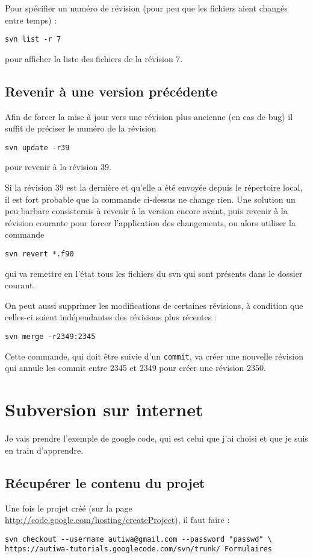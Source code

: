 \documentclass[a4paper,twoside]{article}
\begin{document}
Pour spécifier un numéro de révision (pour peu que les fichiers aient changés entre temps) : 
\begin{verbatim}
svn list -r 7
\end{verbatim}
pour afficher la liste des fichiers de la révision 7.

\subsection{Revenir à une version précédente}
Afin de forcer la mise à jour vers une révision plus ancienne (en cas de bug) il suffit de préciser le numéro de la révision
\begin{verbatim}
svn update -r39
\end{verbatim}
pour revenir à la révision $39$.

\begin{remarque}
Si la révision $39$ est la dernière et qu'elle a été envoyée depuis le répertoire local, il est fort probable que la commande ci-dessus ne change rien. Une solution un peu barbare consisterais à revenir à la version encore avant, puis revenir à la révision courante pour forcer l'application des changements, ou alors utiliser la commande 
\begin{verbatim}
svn revert *.f90
\end{verbatim}
qui va remettre en l'état tous les fichiers du svn qui sont présents dans le dossier courant.

\end{remarque}


\bigskip

On peut aussi supprimer les modifications de certaines révisions, à condition que celles-ci soient indépendantes des révisions plus récentes : 
\begin{verbatim}
svn merge -r2349:2345
\end{verbatim}

Cette commande, qui doit être suivie d'un \texttt{commit}, va créer une nouvelle révision qui annule les commit entre 2345 et 2349 pour créer une révision 2350. 


\section{Subversion sur internet}
Je vais prendre l'exemple de google code, qui est celui que j'ai choisi et que je suis en train d'apprendre.

\subsection{Récupérer le contenu du projet}\label{sec:checkout}
Une fois le projet créé (sur la page \url{http://code.google.com/hosting/createProject}), il faut faire : 
\begin{verbatim}
svn checkout --username autiwa@gmail.com --password "passwd" \
https://autiwa-tutorials.googlecode.com/svn/trunk/ Formulaires
\end{verbatim}
\end{document}
